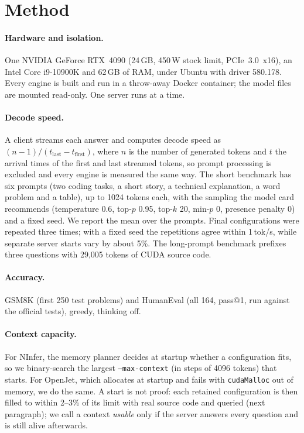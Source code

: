 \section{Method}
\label{sec:method}

\paragraph{Hardware and isolation.}
One NVIDIA GeForce RTX~4090 (24\,GB, 450\,W stock limit, PCIe~3.0~x16), an Intel Core
i9-10900K and 62\,GB of RAM, under Ubuntu with driver 580.178. Every engine is built and run in a
throw-away Docker container; the model files are mounted read-only. One server runs at a time.

\paragraph{Decode speed.}
A client streams each answer and computes decode speed as $(n-1)/(t_\text{last}-t_\text{first})$,
where $n$ is the number of generated tokens and $t$ the arrival times of the first and last
streamed tokens, so prompt processing is excluded and every engine is measured the same way. The
short benchmark has six prompts (two coding tasks, a short story, a technical explanation, a word
problem and a table), up to 1024 tokens each, with the sampling the model card recommends
(temperature 0.6, top-$p$ 0.95, top-$k$ 20, min-$p$ 0, presence penalty 0) and a fixed seed. We
report the mean over the prompts. Final configurations were repeated three times; with a fixed
seed the repetitions agree within 1\,tok/s, while separate server starts vary by about 5\%.
The long-prompt benchmark prefixes three questions with 29{,}005 tokens of CUDA source code.

\paragraph{Accuracy.}
GSM8K (first 250 test problems) and HumanEval
(all 164, pass@1, run against the official tests), greedy, thinking off.

\paragraph{Context capacity.}
For NInfer, the memory planner decides at startup whether a configuration fits, so we
binary-search the largest \texttt{--max-context} (in steps of 4096 tokens) that starts. For
OpenJet, which allocates at startup and fails with \texttt{cudaMalloc} out of memory, we do the
same. A start is not proof: each retained configuration is then filled to within 2--3\% of its
limit with real source code and queried (next paragraph); we call a context \emph{usable} only
if the server answers every question and is still alive afterwards.

